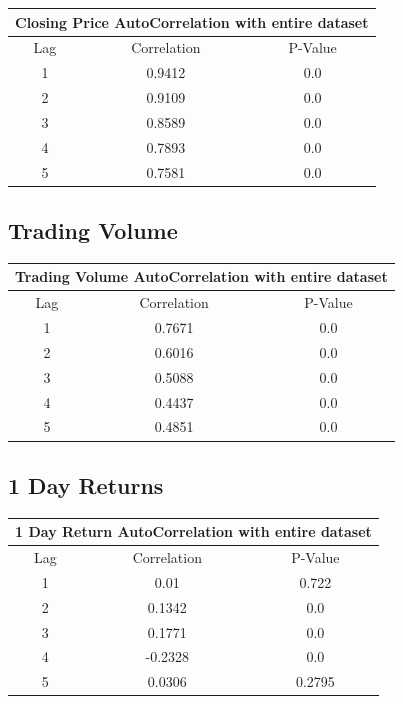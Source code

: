 \begin{center}
\begin{tabular}{ c c c } 
\hline
\multicolumn{3}{|c|}{Closing Price AutoCorrelation with entire dataset} \\
\hline
Lag & Correlation & P-Value \\
\hline
1 & 0.9412 & 0.0 \\
2 & 0.9109 & 0.0 \\
3 & 0.8589 & 0.0 \\
4 & 0.7893 & 0.0 \\
5 & 0.7581 & 0.0 \\
\end{tabular}
\end{center}

\subsection{Trading Volume}

\begin{center}
\begin{tabular}{ c c c }
\hline
\multicolumn{3}{|c|}{Trading Volume AutoCorrelation with entire dataset} \\
\hline
Lag & Correlation & P-Value \\
\hline
1 & 0.7671 & 0.0 \\
2 & 0.6016 & 0.0 \\
3 & 0.5088 & 0.0 \\
4 & 0.4437 & 0.0 \\
5 & 0.4851 & 0.0 \\
\end{tabular}
\end{center}

\subsection{1 Day Returns}

\begin{center}
\begin{tabular}{ c c c }
\hline
\multicolumn{3}{|c|}{1 Day Return AutoCorrelation with entire dataset} \\
\hline
Lag & Correlation & P-Value \\
\hline
1 & 0.01 & 0.722 \\
2 & 0.1342 & 0.0 \\
3 & 0.1771 & 0.0 \\
4 & -0.2328 & 0.0 \\
5 & 0.0306 & 0.2795 \\
\end{tabular}
\end{center}

